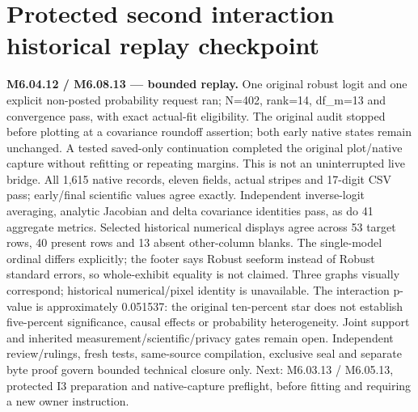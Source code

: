 \documentclass[11pt,a4paper]{article}
\begin{document}
\section*{Protected second interaction historical replay checkpoint}
\noindent\textbf{M6.04.12 / M6.08.13 --- bounded replay.}
One original robust logit and one explicit non-posted probability request ran;
N=402, rank=14, df\_m=13 and convergence pass, with exact actual-fit eligibility.
The original audit stopped before plotting at a covariance roundoff assertion;
both early native states remain unchanged. A tested saved-only continuation
completed the original plot/native capture without refitting or repeating margins.
This is not an uninterrupted live bridge. All 1,615 native records, eleven fields,
actual stripes and 17-digit CSV pass; early/final scientific values agree exactly.
Independent inverse-logit averaging, analytic Jacobian and delta covariance
identities pass, as do 41 aggregate metrics. Selected historical numerical displays
agree across 53 target rows, 40 present rows and 13 absent other-column blanks.
The single-model ordinal differs explicitly; the footer says Robust seeform
instead of Robust standard errors, so whole-exhibit equality is not claimed.
Three graphs visually correspond; historical numerical/pixel identity is unavailable.
The interaction p-value is approximately 0.051537: the original ten-percent star
does not establish five-percent significance, causal effects or probability heterogeneity.
Joint support and inherited measurement/scientific/privacy gates remain open.
Independent review/rulings, fresh tests, same-source compilation, exclusive seal
and separate byte proof govern bounded technical closure only. Next:
M6.03.13 / M6.05.13, protected I3 preparation and native-capture preflight,
before fitting and requiring a new owner instruction.
\end{document}

